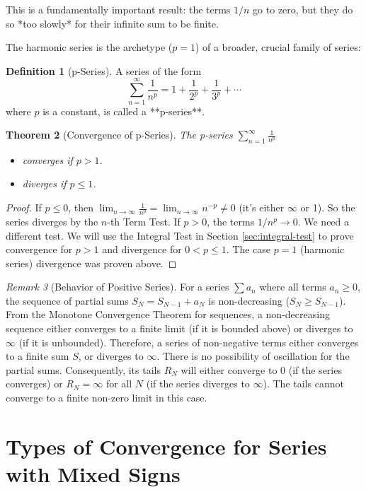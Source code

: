 \documentclass[11pt, letterpaper]{article}
\theoremstyle{plain} %
\newtheorem{theorem}{Theorem}[section] %
\theoremstyle{definition} %
\newtheorem{definition}[theorem]{Definition} %
\theoremstyle{remark} %
\newtheorem{remark}[theorem]{Remark} %
\begin{document}
This is a fundamentally important result: the terms $1/n$ go to zero, but they do so *too slowly* for their infinite sum to be finite.

The harmonic series is the archetype ($p=1$) of a broader, crucial family of series:

\begin{definition}[p-Series]
A series of the form
\[ \sum_{n=1}^{\infty} \frac{1}{n^p} = 1 + \frac{1}{2^p} + \frac{1}{3^p} + \dotsb \]
where $p$ is a constant, is called a **p-series**.
\end{definition}

\begin{theorem}[Convergence of p-Series]
The p-series $\sum_{n=1}^{\infty} \frac{1}{n^p}$
\begin{itemize}
    \item converges if $p > 1$.
    \item diverges if $p \le 1$.
\end{itemize}
\end{theorem}

\begin{proof}
If $p \le 0$, then $\lim_{n \to \infty} \frac{1}{n^p} = \lim_{n \to \infty} n^{-p} \neq 0$ (it's either $\infty$ or 1). So the series diverges by the $n$-th Term Test.
If $p > 0$, the terms $1/n^p \to 0$. We need a different test. We will use the Integral Test in Section \ref{sec:integral-test} to prove convergence for $p>1$ and divergence for $0 < p \le 1$. The case $p=1$ (harmonic series) divergence was proven above.
\end{proof}

\begin{remark}[Behavior of Positive Series]
For a series $\sum a_n$ where all terms $a_n \ge 0$, the sequence of partial sums $S_N = S_{N-1} + a_N$ is non-decreasing ($S_N \ge S_{N-1}$). From the Monotone Convergence Theorem for sequences, a non-decreasing sequence either converges to a finite limit (if it is bounded above) or diverges to $\infty$ (if it is unbounded).
Therefore, a series of non-negative terms either converges to a finite sum $S$, or diverges to $\infty$. There is no possibility of oscillation for the partial sums. Consequently, its tails $R_N$ will either converge to 0 (if the series converges) or $R_N = \infty$ for all $N$ (if the series diverges to $\infty$). The tails cannot converge to a finite non-zero limit in this case.
\end{remark}

\section{Types of Convergence for Series with Mixed Signs}
\end{document}
